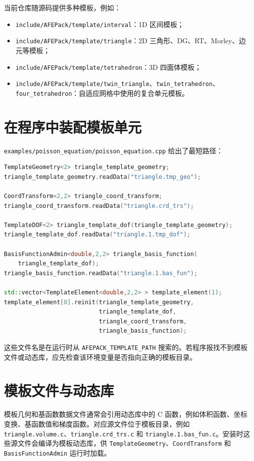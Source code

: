 \documentclass[UTF8,openany,zihao=-4,scheme=chinese]{ctexbook}
\newcommand{\file}[1]{\nolinkurl{#1}}
\newcommand{\class}[1]{\texttt{#1}}
\newcommand{\cmd}[1]{\texttt{#1}}
\begin{document}
当前仓库随源码提供多种模板，例如：

\begin{itemize}[leftmargin=2em]
  \item \file{include/AFEPack/template/interval}：1D 区间模板；
  \item \file{include/AFEPack/template/triangle}：2D 三角形、DG、RT、Morley、边元等模板；
  \item \file{include/AFEPack/template/tetrahedron}：3D 四面体模板；
  \item \file{include/AFEPack/template/twin_triangle}、\file{twin_tetrahedron}、\file{four_tetrahedron}：自适应网格中使用的复合单元模板。
\end{itemize}

\section{在程序中装配模板单元}

\file{examples/poisson_equation/poisson_equation.cpp} 给出了最短路径：

\begin{lstlisting}[language=C++]
TemplateGeometry<2> triangle_template_geometry;
triangle_template_geometry.readData("triangle.tmp_geo");

CoordTransform<2,2> triangle_coord_transform;
triangle_coord_transform.readData("triangle.crd_trs");

TemplateDOF<2> triangle_template_dof(triangle_template_geometry);
triangle_template_dof.readData("triangle.1.tmp_dof");

BasisFunctionAdmin<double,2,2> triangle_basis_function(
    triangle_template_dof);
triangle_basis_function.readData("triangle.1.bas_fun");

std::vector<TemplateElement<double,2,2> > template_element(1);
template_element[0].reinit(triangle_template_geometry,
                           triangle_template_dof,
                           triangle_coord_transform,
                           triangle_basis_function);
\end{lstlisting}

这些文件名是在运行时从 \cmd{AFEPACK\_TEMPLATE\_PATH} 搜索的。若程序报找不到模板文件或动态库，应先检查该环境变量是否指向正确的模板目录。

\section{模板文件与动态库}

模板几何和基函数数据文件通常会引用动态库中的 C 函数，例如体积函数、坐标变换、基函数值和梯度函数。对应源文件位于模板目录，例如 \file{triangle.volume.c}、\file{triangle.crd_trs.c} 和 \file{triangle.1.bas_fun.c}。安装时这些源文件会编译为模板动态库，供 \class{TemplateGeometry}、\class{CoordTransform} 和 \class{BasisFunctionAdmin} 运行时加载。
\end{document}
